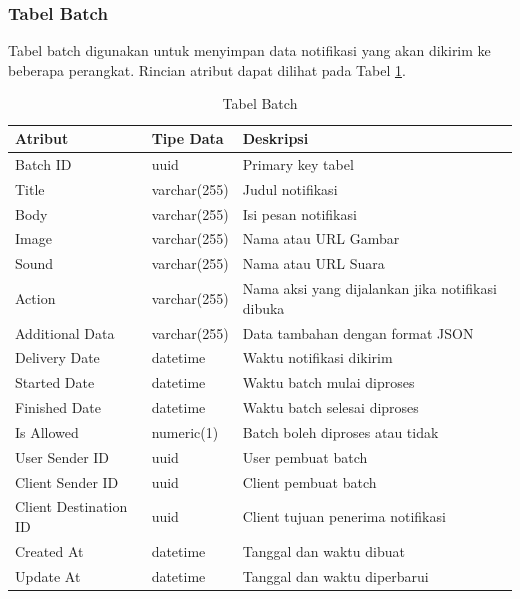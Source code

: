 \subsubsection{Tabel Batch}
\par Tabel batch digunakan untuk menyimpan data notifikasi yang akan dikirim ke beberapa perangkat. Rincian atribut dapat dilihat pada Tabel \ref{tabel_batch}.
\begin{longtable}{|p{2cm}|p{2.5cm}|p{4.5cm}|}
	\caption{Tabel Batch} \label{tabel_batch} \\ \hline
    {Atribut} & {Tipe Data} & {Deskripsi} \\ \hline
    Batch ID & uuid & Primary key tabel \\ \hline
    Title & varchar(255) & Judul notifikasi \\ \hline
    Body & varchar(255) & Isi pesan notifikasi \\ \hline
    Image & varchar(255) & Nama atau URL Gambar \\ \hline
    Sound & varchar(255) & Nama atau URL Suara \\ \hline
    Action & varchar(255) & Nama aksi yang dijalankan jika notifikasi dibuka \\ \hline
    Additional Data & varchar(255) & Data tambahan dengan format JSON \\ \hline
    Delivery Date & datetime & Waktu notifikasi dikirim \\ \hline
    Started Date & datetime & Waktu batch mulai diproses \\ \hline
    Finished Date & datetime & Waktu batch selesai diproses \\ \hline
    Is Allowed & numeric(1) & Batch boleh diproses atau tidak \\ \hline
    User Sender ID & uuid & User pembuat batch \\ \hline
    Client Sender ID & uuid & Client pembuat batch \\ \hline
    Client Destination ID & uuid & Client tujuan penerima notifikasi \\ \hline
    Created At & datetime & Tanggal dan waktu dibuat \\ \hline
    Update At & datetime & Tanggal dan waktu diperbarui \\ \hline
\end{longtable}


